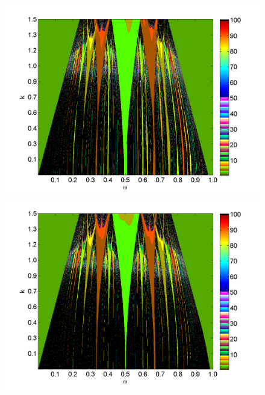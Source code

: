 \begin{figure}[H]
\includegraphics[width=.5\textwidth]{figs/tongues_1000_L_05.png}\hfill
\includegraphics[width=.5\textwidth]{figs/tongues_1000_L_09.png}\\
\end{figure}


